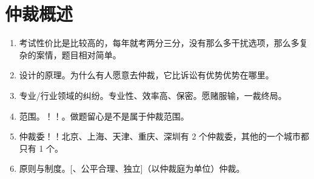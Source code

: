 \section{仲裁概述}
\begin{enumerate}
  \item 考试性价比是比较高的，每年就考两分三分，没有那么多干扰选项，那么多复杂的案情，题目相对简单。
  \item 设计的原理。为什么有人愿意去仲裁，它比诉讼有优势优势在哪里。
  \item 专业/行业领域的纠纷。专业性、效率高、保密。愿赌服输，一裁终局。
  \item 范围。！！。做题留心是不是属于仲裁范围。
  \item 仲裁委！！北京、上海、天津、重庆、深圳有 2 个仲裁委，其他的一个城市都只有 1 个。
  \item 原则与制度。[、公平合理、独立]（以仲裁庭为单位）仲裁。
\end{enumerate}

